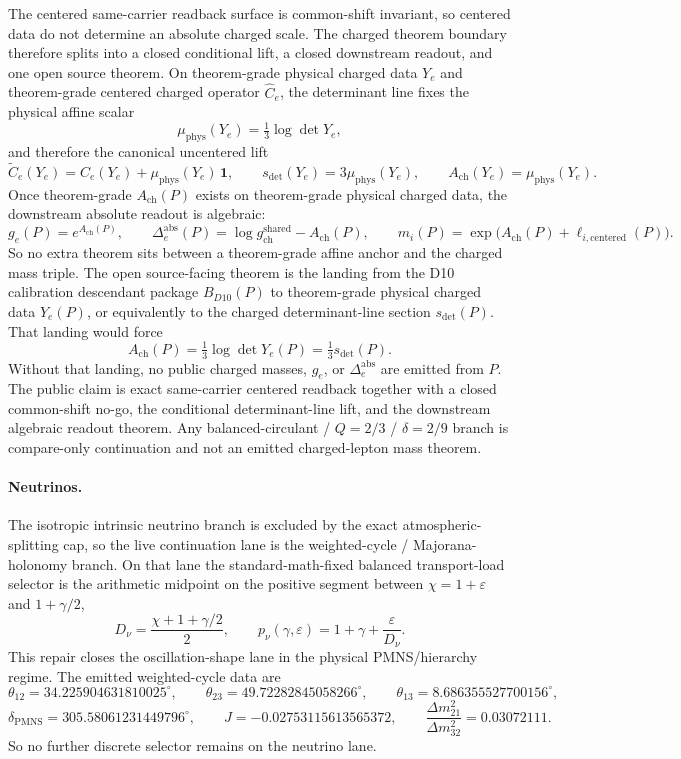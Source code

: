 \documentclass[11pt]{article}
\begin{document}
The centered same-carrier readback surface is common-shift invariant, so centered data do not determine an absolute charged scale. The charged theorem boundary therefore splits into a closed conditional lift, a closed downstream readout, and one open source theorem. On theorem-grade physical charged data \(Y_e\) and theorem-grade centered charged operator \(\widehat C_e\), the determinant line fixes the physical affine scalar
\[
\mu_{\mathrm{phys}}(Y_e)=\tfrac13\log\det Y_e,
\]
and therefore the canonical uncentered lift
\[
\widetilde C_e(Y_e)=\widehat C_e(Y_e)+\mu_{\mathrm{phys}}(Y_e)\,\mathbf 1,
\qquad
s_{\det}(Y_e)=3\mu_{\mathrm{phys}}(Y_e),
\qquad
A_{\mathrm{ch}}(Y_e)=\mu_{\mathrm{phys}}(Y_e).
\]
Once theorem-grade \(A_{\mathrm{ch}}(P)\) exists on theorem-grade physical charged data, the downstream absolute readout is algebraic:
\[
g_e(P)=e^{A_{\mathrm{ch}}(P)},
\qquad
\Delta_e^{\mathrm{abs}}(P)=\log g_{\mathrm{ch}}^{\mathrm{shared}}-A_{\mathrm{ch}}(P),
\qquad
m_i(P)=\exp\!\bigl(A_{\mathrm{ch}}(P)+\ell_{i,\mathrm{centered}}(P)\bigr).
\]
So no extra theorem sits between a theorem-grade affine anchor and the charged mass triple. The open source-facing theorem is the landing from the D10 calibration descendant package \(B_{D10}(P)\) to theorem-grade physical charged data \(Y_e(P)\), or equivalently to the charged determinant-line section \(s_{\det}(P)\). That landing would force
\[
A_{\mathrm{ch}}(P)=\tfrac13\log\det Y_e(P)=\tfrac13 s_{\det}(P).
\]
Without that landing, no public charged masses, \(g_e\), or \(\Delta_e^{\mathrm{abs}}\) are emitted from \(P\). The public claim is exact same-carrier centered readback together with a closed common-shift no-go, the conditional determinant-line lift, and the downstream algebraic readout theorem. Any balanced-circulant / \(Q=2/3\) / \(\delta=2/9\) branch is compare-only continuation and not an emitted charged-lepton mass theorem.

\paragraph{Neutrinos.}\label{step5-neutrino-continuation}
The isotropic intrinsic neutrino branch is excluded by the exact atmospheric-splitting cap, so the live continuation lane is the weighted-cycle / Majorana-holonomy branch. On that lane the standard-math-fixed balanced transport-load selector is the arithmetic midpoint on the positive segment between \(\chi=1+\varepsilon\) and \(1+\gamma/2\),
\[
D_\nu=\frac{\chi+1+\gamma/2}{2},
\qquad
p_\nu(\gamma,\varepsilon)=1+\gamma+\frac{\varepsilon}{D_\nu}.
\]
This repair closes the oscillation-shape lane in the physical PMNS/hierarchy regime. The emitted weighted-cycle data are
\[
\theta_{12}=34.225904631810025^\circ,\qquad
\theta_{23}=49.72282845058266^\circ,\qquad
\theta_{13}=8.686355527700156^\circ,
\]
\[
\delta_{\mathrm{PMNS}}=305.58061231449796^\circ,\qquad
J=-0.02753115613565372,\qquad
\frac{\Delta m_{21}^2}{\Delta m_{32}^2}=0.03072111.
\]
So no further discrete selector remains on the neutrino lane.
\end{document}
